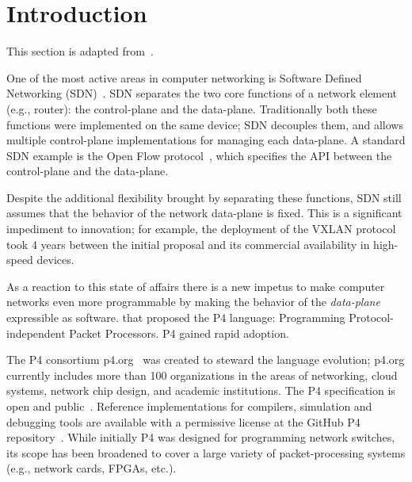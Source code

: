 \section{Introduction}\label{sec:introduction}

This section is adapted from~\cite{budiu-osr17}.

One of the most active areas in computer networking is Software
Defined Networking (SDN)~\cite{rfc7426}.  SDN separates the two core
functions of a network element (e.g., router): the control-plane and
the data-plane.  Traditionally both these functions were implemented
on the same device; SDN decouples them, and allows multiple
control-plane implementations for managing each data-plane.  A
standard SDN example is the Open Flow protocol~\cite{mckeown-ccr08},
which specifies the API between the control-plane and the data-plane.

Despite the additional flexibility brought by separating these
functions, SDN still assumes that the behavior of the network
data-plane is fixed.  This is a significant impediment to innovation;
for example, the deployment of the VXLAN protocol~\cite{rfc7348} took
4 years between the initial proposal and its commercial availability
in high-speed devices.

As a reaction to this state of affairs there is a new impetus to make
computer networks even more programmable by making the behavior of the
\emph{data-plane} expressible as software.  \cite{bosshart-ccr14} that
proposed the P4 language: Programming Protocol-independent Packet
Processors.  P4 gained rapid adoption.

The P4 consortium p4.org~\cite{p4org} was created to steward the
language evolution; p4.org currently includes more than 100
organizations in the areas of networking, cloud systems, network chip
design, and academic institutions.  The P4 specification is open and
public~\cite{p416-spec17}.  Reference implementations for compilers,
simulation and debugging tools are available with a permissive license
at the GitHub P4 repository~\cite{p4lang}.  While initially P4 was
designed for programming network switches, its scope has been
broadened to cover a large variety of packet-processing systems (e.g.,
network cards, FPGAs, etc.).
